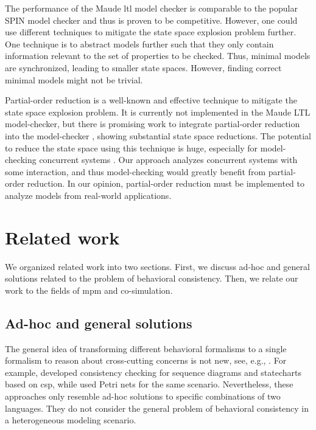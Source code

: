 \documentclass{jot}
\begin{document}
The performance of the Maude \gls*{ltl} model checker is comparable to the popular SPIN model checker \cite{ekerMaudeLTLModel2004} and thus is proven to be competitive.
However, one could use different techniques to mitigate the state space explosion problem further.
One technique is to abstract models further such that they only contain information relevant to the set of properties to be checked.
Thus, minimal models are synchronized, leading to smaller state spaces.
However, finding correct minimal models might not be trivial.

Partial-order reduction is a well-known and effective technique to mitigate the state space explosion problem.
It is currently not implemented in the Maude LTL model-checker, but there is promising work to integrate partial-order reduction into the model-checker \cite{farzanPartialOrderReduction2007}, showing substantial state space reductions.
The potential to reduce the state space using this technique is huge, especially for model-checking concurrent systems \cite{clarkeHandbookModelChecking2018}.
Our approach analyzes concurrent systems with some interaction, and thus model-checking would greatly benefit from partial-order reduction.
In our opinion, partial-order reduction must be implemented to analyze models from real-world applications.


\section{Related work} \label{sec:related_work}
We organized related work into two sections.
First, we discuss ad-hoc and general solutions related to the problem of behavioral consistency.
Then, we relate our work to the fields of \gls*{mpm} and co-simulation.

\subsection{Ad-hoc and general solutions}
The general idea of transforming different behavioral formalisms to a single formalism to reason about cross-cutting concerns is not new, see, e.g., \cite{engelsMethodologySpecifyingAnalyzing2001}.
For example, \cite{kusterExplicitBehavioralConsistency2003} developed consistency checking for sequence diagrams and statecharts based on \gls*{csp}, while \cite{yaoConsistencyCheckingUML2006} used Petri nets for the same scenario.
Nevertheless, these approaches only resemble ad-hoc solutions to specific combinations of two languages.
They do not consider the general problem of behavioral consistency in a heterogeneous modeling scenario.
\end{document}
